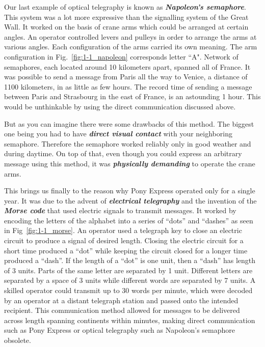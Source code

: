Our last example of optical telegraphy is known as \textit{\textbf{Napoleon's semaphore}}.
This system was a lot more expressive than the signalling system of the Great Wall.
It worked on the basis of crane arms which could be arranged at certain angles.
An operator controlled levers and pulleys in order to arrange the arms at various angles. Each configuration of the arms carried its own meaning.
The arm configuration in Fig.~\ref{fig:1-1_napoleon} corresponds letter ``A".
Network of semaphores, each located around 10 kilometers apart, spanned all of France.
It was possible to send a message from Paris all the way to Venice, a distance of 1100 kilometers, in as little as few hours.
The record time of sending a message between Paris and Strasbourg in the east of France, is an astounding 1 hour.
This would be unthinkable by using the direct communication discussed above.

But as you can imagine there were some drawbacks of this method.
The biggest one being you had to have \textit{\textbf{direct visual contact}} with your neighboring semaphore.
Therefore the semaphore worked reliably only in good weather and during daytime.
On top of that, even though you could express an arbitrary message using this method, it was \textit{\textbf{physically demanding}} to operate the crane arms.

This brings us finally to the reason why Pony Express operated only for a single year.
It was due to the advent of \textit{\textbf{electrical telegraphy}} and the invention of the \textit{\textbf{Morse code}} that used electric signals to transmit messages.
It worked by encoding the letters of the alphabet into a series of ``dots'' and ``dashes'' as seen in Fig~\ref{fig:1-1_morse}.
An operator used a telegraph key to close an electric circuit to produce a signal of desired length.
Closing the electric circuit for a short time produced a ``dot'' while keeping the circuit closed for a longer time produced a ``dash''.
If the length of a ``dot'' is one unit, then a ``dash'' has length of 3 units.
Parts of the same letter are separated by 1 unit.
Different letters are separated by a space of 3 units while different words are separated by 7 units.
A skilled operator could transmit up to 30 words per minute, which were decoded by an operator at a distant telegraph station and passed onto the intended recipient.
This communication method allowed for messages to be delivered across length spanning continents within minutes, making direct communication such as Pony Express or optical telegraphy such as Napoleon's semaphore obsolete.

